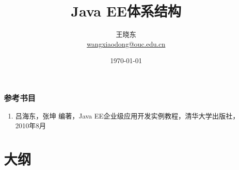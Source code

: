 
\title[KevinW@OUC]{\\  
 Java EE体系结构}
\author[王晓东]{王晓东\\
  \href{mailto:wangxiaodong@ouc.edu.cn}{\footnotesize wangxiaodong@ouc.edu.cn}}
\date{\today}


 \frame{\titlepage}

\begin{frame}
\frametitle{参考书目}
\begin{enumerate}
\item 吕海东，张坤 编著，Java EE企业级应用开发实例教程，清华大学出版社，2010年8月
\end{enumerate}  
\end{frame}


\section*{大纲}

